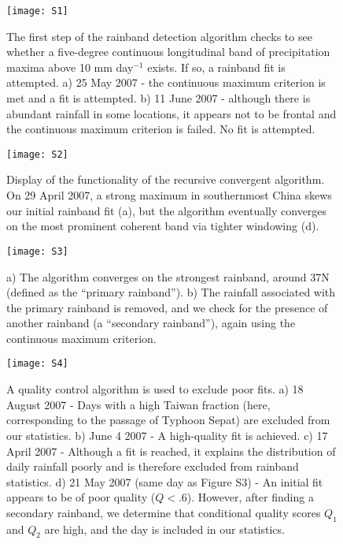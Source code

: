 \documentclass[draft,grl]{agutexSI}
\begin{document}
 
\begin{figure}

\noindent\texttt{[image: S1]}
\caption{The first step of the rainband detection algorithm checks to see whether a five-degree continuous longitudinal band of precipitation maxima above 10 mm day$^{-1}$ exists. If so, a rainband fit is attempted. a) 25 May 2007 - the continuous maximum criterion is met and a fit is attempted. b) 11 June 2007 - although there is abundant rainfall in some locations, it appears not to be frontal and the continuous maximum criterion is failed. No fit is attempted.}
\end{figure}

\begin{figure}

\noindent\texttt{[image: S2]}
\caption{Display of the functionality of the recursive convergent algorithm. On 29 April 2007, a strong maximum in southernmost China skews our initial rainband fit (a), but the algorithm eventually converges on the most prominent coherent band via tighter windowing (d).}
\end{figure}

\begin{figure}

\noindent\texttt{[image: S3]}
\caption{a) The algorithm converges on the strongest rainband, around 37N (defined as the ``primary rainband''). b) The rainfall associated with the primary rainband is removed, and we check for the presence of another rainband (a ``secondary rainband''), again using the continuous maximum criterion.}
\end{figure}

\begin{figure}

\noindent\texttt{[image: S4]}
\caption{A quality control algorithm is used to exclude poor fits. a) 18 August 2007 - Days with a high Taiwan fraction (here, corresponding to the passage of Typhoon Sepat) are excluded from our statistics. b) June 4 2007 - A high-quality fit is achieved. c) 17 April 2007 - Although a fit is reached, it explains the distribution of daily rainfall poorly and is therefore excluded from rainband statistics. d) 21 May 2007 (same day as Figure S3) - An initial fit appears to be of poor quality ($Q<.6$). However, after finding a secondary rainband, we determine that conditional quality scores $Q_1$ and $Q_2$ are high, and the day is included in our statistics.}
\end{figure}
\end{document}
